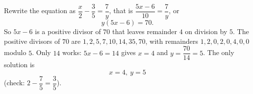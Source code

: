 Rewrite the equation as $\dfrac{x}{2}-\dfrac{3}{5}=\dfrac{7}{y}$, that is $\dfrac{5x-6}{10}=\dfrac{7}{y}$, or
\[
y(5x-6)=70 .
\]
So $5x-6$ is a positive divisor of $70$ that leaves remainder $4$ on division by $5$. The positive divisors of $70$ are $1,2,5,7,10,14,35,70$, with remainders $1,2,0,2,0,4,0,0$ modulo $5$. Only $14$ works: $5x-6=14$ gives $x=4$ and $y=\dfrac{70}{14}=5$. The only solution is
\[
\boxed{x=4,\ y=5}
\]
(check: $2-\dfrac{7}{5}=\dfrac{3}{5}$).
